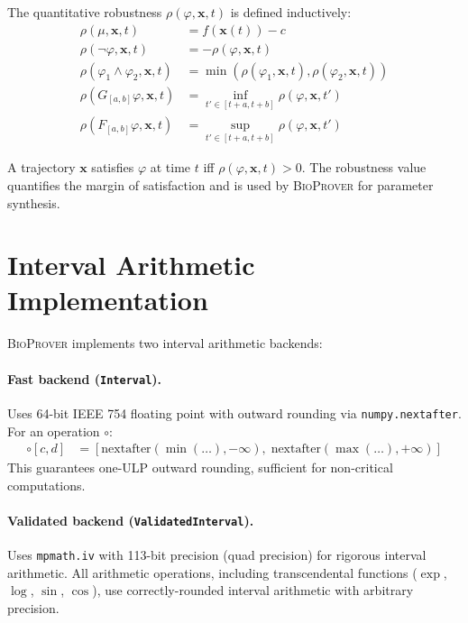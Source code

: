 \documentclass[11pt]{article}
\newcommand{\bioprover}{\textsc{BioProver}}
\begin{document}
The quantitative robustness $\rho(\varphi, \mathbf{x}, t)$ is defined
inductively:
\begin{align}
\rho(\mu, \mathbf{x}, t) &= f(\mathbf{x}(t)) - c \\
\rho(\neg\varphi, \mathbf{x}, t) &= -\rho(\varphi, \mathbf{x}, t) \\
\rho(\varphi_1 \land \varphi_2, \mathbf{x}, t) &=
  \min(\rho(\varphi_1, \mathbf{x}, t), \rho(\varphi_2, \mathbf{x}, t)) \\
\rho(G_{[a,b]}\varphi, \mathbf{x}, t) &=
  \inf_{t' \in [t+a, t+b]} \rho(\varphi, \mathbf{x}, t') \\
\rho(F_{[a,b]}\varphi, \mathbf{x}, t) &=
  \sup_{t' \in [t+a, t+b]} \rho(\varphi, \mathbf{x}, t')
\end{align}

A trajectory $\mathbf{x}$ satisfies $\varphi$ at time $t$ iff
$\rho(\varphi, \mathbf{x}, t) > 0$. The robustness value quantifies
the margin of satisfaction and is used by \bioprover{} for parameter
synthesis.

\section{Interval Arithmetic Implementation}
\label{app:interval}

\bioprover{} implements two interval arithmetic backends:

\paragraph{Fast backend (\texttt{Interval}).}
Uses 64-bit IEEE 754 floating point with outward rounding via
\texttt{numpy.nextafter}. For an operation $\circ$:
\begin{align}
[a,b] \circ [c,d] &= [\text{nextafter}(\min(\ldots), -\infty),\;
                       \text{nextafter}(\max(\ldots), +\infty)]
\end{align}
This guarantees one-ULP outward rounding, sufficient for non-critical
computations.

\paragraph{Validated backend (\texttt{ValidatedInterval}).}
Uses \texttt{mpmath.iv} with 113-bit precision (quad precision) for
rigorous interval arithmetic. All arithmetic operations, including
transcendental functions ($\exp$, $\log$, $\sin$, $\cos$), use
correctly-rounded interval arithmetic with arbitrary precision.
\end{document}
